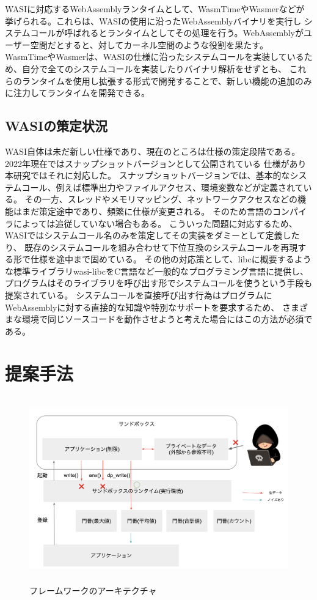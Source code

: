 \documentclass[a4paper,11pt]{jreport}
\begin{document}
WASIに対応するWebAssemblyランタイムとして、WasmTime\cite{wasmtime}やWasmer\cite{wasmer}などが挙げられる。これらは、WASIの使用に沿ったWebAssemblyバイナリを実行し
システムコールが呼ばれるとランタイムとしてその処理を行う。WebAssemblyがユーザー空間だとすると、対してカーネル空間のような役割を果たす。
WasmTimeやWasmerは、WASIの仕様に沿ったシステムコールを実装しているため、自分で全てのシステムコールを実装したりバイナリ解析をせずとも、
これらのランタイムを使用し拡張する形式で開発することで、新しい機能の追加のみに注力してランタイムを開発できる。

\section{WASIの策定状況}

WASI自体は未だ新しい仕様であり、現在のところは仕様の策定段階である。2022年現在ではスナップショットバージョンとして公開されている
仕様があり本研究ではそれに対応した。
スナップショットバージョンでは、基本的なシステムコール、例えば標準出力やファイルアクセス、環境変数などが定義されている。
その一方、スレッドやメモリマッピング、ネットワークアクセスなどの機能はまだ策定途中であり、頻繁に仕様が変更される。
そのため言語のコンパイラによっては追従していない場合もある。
こういった問題に対応するため、WASIではシステムコール名のみを策定してその実装をダミーとして定義したり\cite{wasi-pr-thread}、
既存のシステムコールを組み合わせて下位互換のシステムコールを再現する形\cite{wasi-issue-thread}で仕様を途中まで固めている。
その他の対応策として、libcに概要するような標準ライブラリwasi-libcをC言語など一般的なプログラミング言語に提供し、
プログラムはそのライブラリを呼び出す形でシステムコールを使うという手段も提案されている。
システムコールを直接呼び出す行為はプログラムにWebAssemblyに対する直接的な知識や特別なサポートを要求するため、
さまざまな環境で同じソースコードを動作させようと考えた場合にはこの方法が必須である。

\chapter{提案手法}

\begin{figure}[htbp]
    \centering
\includegraphics[height=80mm]{architecture2.png}
    \caption{フレームワークのアーキテクチャ}
    \label{fig:architecture}
\end{figure}
\end{document}
